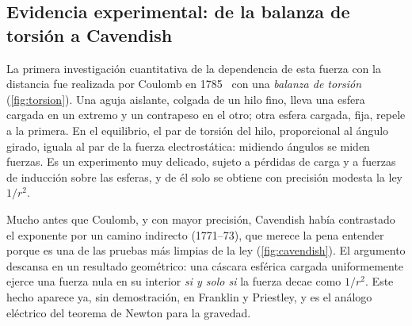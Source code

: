 \subsection{Evidencia experimental: de la balanza de torsión a Cavendish}\label{sec:coulomb-exp}
La primera investigación cuantitativa de la dependencia de esta fuerza con la distancia fue
realizada por Coulomb en 1785~\cite{COULOMB} con una \emph{balanza de torsión}
(\cref{fig:torsion}). Una aguja aislante, colgada de un hilo fino, lleva una esfera cargada en un extremo
y un contrapeso en el otro; otra esfera cargada, fija, repele a la primera. En el equilibrio, el par
de torsión del hilo, proporcional al ángulo girado, iguala al par de la fuerza electrostática: midiendo ángulos se miden
fuerzas. Es un experimento muy delicado, sujeto a pérdidas de carga y a fuerzas de inducción sobre las esferas, y de él
solo se obtiene con precisión modesta la ley $1/r^{2}$.



Mucho antes que Coulomb, y con mayor precisión, Cavendish había contrastado el exponente
por un camino indirecto (1771--73), que merece la pena entender porque es una de las pruebas más
limpias de la ley (\cref{fig:cavendish}). El argumento descansa en un resultado geométrico: una
cáscara esférica cargada uniformemente ejerce una fuerza nula en su interior \emph{si y solo si} la fuerza
decae como $1/r^{2}$. Este hecho aparece ya, sin demostración, en Franklin y Priestley, y es el análogo
eléctrico del teorema de Newton para la gravedad.

